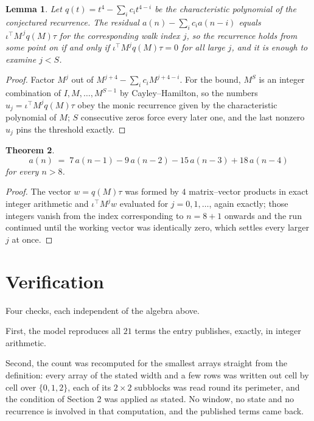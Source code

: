 \documentclass[11pt,a4paper]{article}
\theoremstyle{plain}
\newtheorem{theorem}{Theorem}
\newtheorem{lemma}[theorem]{Lemma}
\theoremstyle{definition}
\begin{document}
\begin{lemma}\label{lem:crit}
Let $q(t)=t^{4}-\sum_i c_it^{4-i}$ be the characteristic polynomial of the
conjectured recurrence. The residual $a(n)-\sum_ic_ia(n-i)$ equals
$\iota^{\!\top}M^{\,j}q(M)\tau$ for the corresponding walk index $j$, so the recurrence
holds from some point on if and only if $\iota^{\!\top}M^{j}q(M)\tau=0$ for all large $j$,
and it is enough to examine $j<S$.
\end{lemma}

\begin{proof}
Factor $M^{j}$ out of $M^{j+4}-\sum_ic_iM^{j+4-i}$. For the bound, $M^{S}$
is an integer combination of $I,M,\dots,M^{S-1}$ by Cayley--Hamilton, so the numbers
$u_j=\iota^{\!\top}M^{j}q(M)\tau$ obey the monic recurrence given by the characteristic
polynomial of $M$; $S$ consecutive zeros force every later one, and the last nonzero $u_j$
pins the threshold exactly.
\end{proof}

\begin{theorem}
\[
a(n)\;=\;7\,a(n-1) - 9\,a(n-2) - 15\,a(n-3) + 18\,a(n-4)
\]
for every $n>8$.
\end{theorem}

\begin{proof}
The vector $w=q(M)\tau$ was formed by $4$ matrix--vector products in exact integer
arithmetic and $\iota^{\!\top}M^{j}w$ evaluated for $j=0,1,\dots$, again exactly; those
integers vanish from the index corresponding to $n=8+1$ onwards and the run continued
until the working vector was identically zero, which settles every larger $j$ at once.
\end{proof}

\section{Verification}

Four checks, each independent of the algebra above.

First, the model reproduces all $21$ terms the entry publishes, exactly, in integer
arithmetic.

Second, the count was recomputed for the smallest arrays straight from the definition: every
array of the stated width and a few rows was written out cell by cell over $\{0,1,2\}$, each of
its $2\times2$ subblocks was read round its perimeter, and the condition of Section 2 was
applied as stated. No window, no state and no recurrence is involved in that computation, and
the published terms came back.
\end{document}

